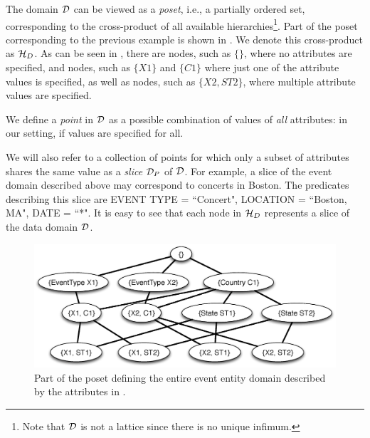 The domain $\mathcal{D}$ can be viewed as a {\em poset}, i.e., a partially ordered set, corresponding to the cross-product of all available hierarchies\footnote{Note that $\mathcal{D}$ is not a lattice since there is no unique infimum.}. Part of the poset corresponding to the previous example is shown in . We denote this cross-product as $\mathcal{H}_D$. As can be seen in , there are nodes, such as $\{\}$, where no attributes are specified, and nodes, such as $\{X1\}$ and $\{C1\}$ where just one of the attribute values is specified, as well as nodes, such as $\{X2, ST2\}$, where multiple attribute values are specified.


We define a {\em point} in $\mathcal{D}$ as a possible combination of values of {\em all} attributes: in our setting, if values are specified for all. 

We will also refer to a collection of points for which only a subset of attributes shares the same value as a {\em slice} $\mathcal{D}_P$ of $\mathcal{D}$. For example, a slice of the event domain described above may correspond to concerts in Boston. The predicates describing this slice are EVENT TYPE = ``Concert", LOCATION = ``Boston, MA", DATE = ``*".  It is easy to see that each node in $\mathcal{H}_D$ represents a slice of the data domain $\mathcal{D}$. 

\begin{figure}[h]
	\begin{center}
	\includegraphics[clip,scale=0.32]{figs/eventsExLattice.eps}
	\caption{Part of the poset defining the entire event entity domain described by the attributes in .}
	\label{fig:eventslattice}
	\end{center}
	\vspace{-10pt}
\end{figure}

